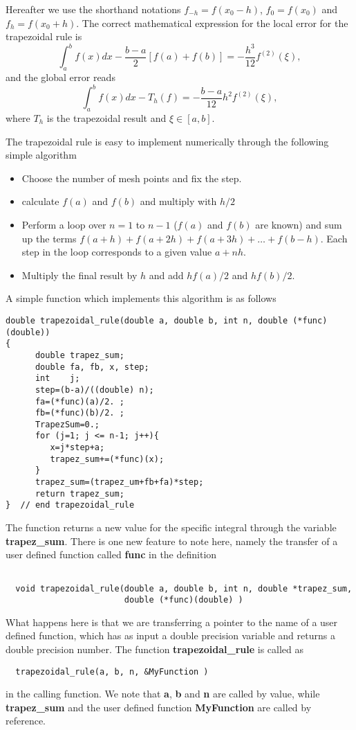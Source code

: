 Hereafter we use the shorthand notations $f_{-h}=f(x_0-h)$, $f_{0}=f(x_0)$
and $f_{h}=f(x_0+h)$.
  The correct mathematical expression for the local error for the trapezoidal rule is
\[
\int_a^bf(x)dx -\frac{b-a}{2}\left[f(a)+f(b)\right]=-\frac{h^3}{12}f^{(2)}(\xi),
\]
and the global error reads
\[
\int_a^bf(x)dx -T_h(f)=-\frac{b-a}{12}h^2f^{(2)}(\xi),
\]
where $T_h$ is the trapezoidal result and $\xi \in [a,b]$.

The trapezoidal rule is easy to  implement numerically 
through the following simple algorithm
\begin{svgraybox}
\begin{itemize}
   \item Choose the number of mesh points and fix the step.
   \item calculate $f(a)$ and $f(b)$ and multiply with $h/2$
   \item Perform a loop over $n=1$ to $n-1$ ($f(a)$ and $f(b)$ are known) and sum up
         the terms $f(a+h) +f(a+2h)+f(a+3h)+\dots +f(b-h)$. Each step in the loop
         corresponds to a given value $a+nh$. 
   \item Multiply the final result by $h$ and add $hf(a)/2$ and $hf(b)/2$.
\end{itemize}
\end{svgraybox}
A simple function which implements this algorithm is as follows
\lstset{language=c++}
\begin{lstlisting}
double trapezoidal_rule(double a, double b, int n, double (*func)(double))
{
      double trapez_sum;
      double fa, fb, x, step;
      int    j;
      step=(b-a)/((double) n);
      fa=(*func)(a)/2. ;
      fb=(*func)(b)/2. ;
      TrapezSum=0.;
      for (j=1; j <= n-1; j++){
         x=j*step+a;
         trapez_sum+=(*func)(x);
      }
      trapez_sum=(trapez_um+fb+fa)*step;
      return trapez_sum;
}  // end trapezoidal_rule 
\end{lstlisting}
The function returns a new value for the specific integral through the variable
{\bf trapez\_sum}. There is one new feature to note here, namely
the transfer of a user defined function called {\bf func} in the 
definition 
\begin{lstlisting}

  void trapezoidal_rule(double a, double b, int n, double *trapez_sum, 
                        double (*func)(double) )       
\end{lstlisting}

What happens here is that we are transferring a pointer to the name 
of a user defined
function, which has as input a double precision variable and returns
a double precision number. The function 
{\bf trapezoidal\_rule} is called as
\begin{lstlisting}
  trapezoidal_rule(a, b, n, &MyFunction )       
\end{lstlisting}
in the calling function. We note that {\bf a}, {\bf b} and {\bf n} are called by value,
while {\bf trapez\_sum} and the user defined function {\bf MyFunction}
are called by reference. 


